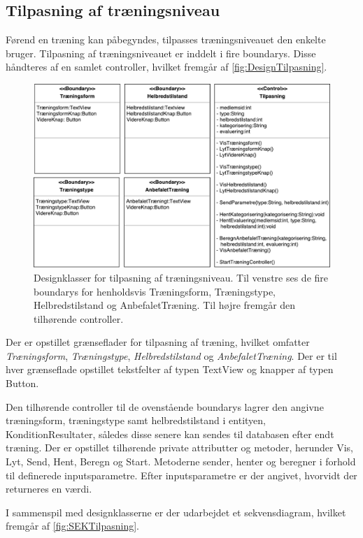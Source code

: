 \subsection*{Tilpasning af træningsniveau}
Førend en træning kan påbegyndes, tilpasses træningsniveauet den enkelte bruger. Tilpasning af træningsniveauet er inddelt i fire boundarys. Disse håndteres af en samlet controller, hvilket fremgår af \autoref{fig:DesignTilpasning}.

\begin{figure} [H]
\centering
\includegraphics[width=1\textwidth]{figures/MVC/MVCTilpasning}
\caption{Designklasser for tilpasning af træningsniveau. Til venstre ses de fire boundarys for henholdsvis Træningsform, Træningstype, Helbredstilstand og AnbefaletTræning. Til højre fremgår den tilhørende controller.}
\label{fig:DesignTilpasning}
\end{figure}

\noindent
Der er opstillet grænseflader for tilpasning af træning, hvilket omfatter \textit{Træningsform}, \textit{Træningstype}, \textit{Helbredstilstand} og \textit{AnbefaletTræning}. Der er til hver grænseflade opstillet tekstfelter af typen TextView og knapper af typen Button.   

Den tilhørende controller til de ovenstående boundarys lagrer den angivne træningsform, træningstype samt helbredstilstand  i entityen, KonditionResultater, således disse senere kan sendes til databasen efter endt træning. Der er opstillet tilhørende private attributter og metoder, herunder Vis, Lyt, Send, Hent, Beregn og Start. Metoderne sender, henter og beregner i forhold til definerede inputsparametre. Efter inputsparametre er der angivet, hvorvidt der returneres en værdi.

I sammenspil med designklasserne er der udarbejdet et sekvensdiagram, hvilket fremgår af \autoref{fig:SEKTilpasning}. 

